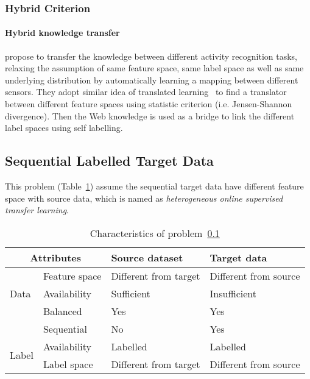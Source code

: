 \documentclass[prodmode]{acmsmall}  %
\begin{document}
\subsubsection{Hybrid Criterion}
\paragraph{Hybrid knowledge transfer}
 propose to transfer the knowledge between different activity recognition tasks, relaxing the assumption of same feature space, same label space as well as same underlying distribution by automatically learning a mapping between different sensors. They adopt similar idea of translated learning~\cite{Dai2008} to find a translator between different feature spaces using statistic criterion (i.e. Jensen-Shannon divergence). Then the Web knowledge is used as a bridge to link the different label spaces using self labelling. 


\subsection{Sequential Labelled Target Data}
\label{sec:HETEFlseq}
This problem (Table~\ref{tab:HETEFlseq}) assume the sequential target data have different feature space with source data, which is named as \textit{heterogeneous online supervised transfer learning}.
\begin{table}[htbp!]
\caption{Characteristics of problem~\ref{sec:HETEFlseq}}
\label{tab:HETEFlseq}
\begin{center}
\begin{small}
\begin{tabular}{|p{1cm}<{\centering}|m{2.5cm}<{\centering}|m{4.3cm}<{\centering}|m{4.3cm}<{\centering}|}
\hline
\multicolumn{2}{|c|}{Attributes} & Source dataset & Target data \\
\hline \hline
\multirow{3}{*}{Data} & Feature space & Different from target & {\color{red}Different from source} \\ 
\cline{2-4}{} & Availability & Sufficient & {\color{red}Insufficient} \\
\cline{2-4}{} & Balanced & Yes & Yes \\
\cline{2-4}{} & Sequential & No & {\color{red}Yes} \\
\hline \hline
\multirow{2}{*}{Label} & Availability & Labelled & Labelled \\
\cline{2-4}{}  & Label space & Different from target & {\color{red}Different from source} \\ 
\hline
\end{tabular}
\end{small}
\end{center}
\end{table}
\end{document}
